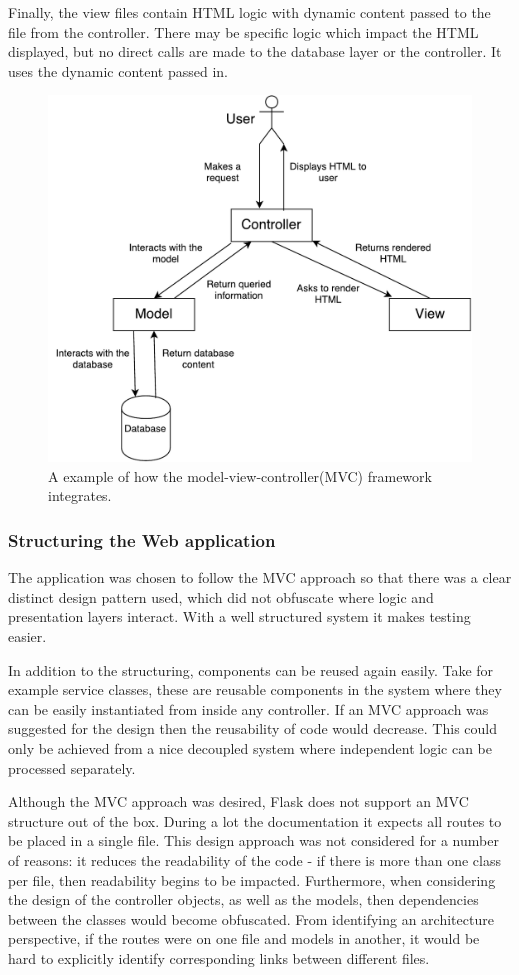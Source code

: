 Finally, the view files contain HTML logic with dynamic content passed to the file from the controller. There may be specific logic which impact the HTML displayed, but no direct calls are made to the database layer or the controller. It uses the dynamic content passed in.
\begin{figure}[h]
  \centering
  \includegraphics[scale=0.5]{images/MVC}
  \caption{A example of how the model-view-controller(MVC) framework integrates.}
  \label{fig:mvc}
\end{figure}

\subsubsection{Structuring the Web application}
The application was chosen to follow the MVC approach so that there was a clear distinct design pattern used, which did not obfuscate where logic and presentation layers interact. With a well structured system it makes testing easier.

In addition to the structuring, components can be reused again easily. Take for example service classes, these are reusable components in the system where they can be easily instantiated from inside any controller. If an MVC approach was suggested for the design then the reusability of code would decrease. This could only be achieved from a nice decoupled system where independent logic can be processed separately.

Although the MVC approach was desired, Flask does not support an MVC structure out of the box. During a lot the documentation it expects all routes to be placed in a single file. This design approach was not considered for a number of reasons: it reduces the readability of the code - if there is more than one class per file, then readability begins to be impacted. Furthermore, when considering the design of the controller objects, as well as the models, then dependencies between the classes would become obfuscated. From identifying an architecture perspective, if the routes were on one file and models in another, it would be hard to explicitly identify corresponding links between different files.

